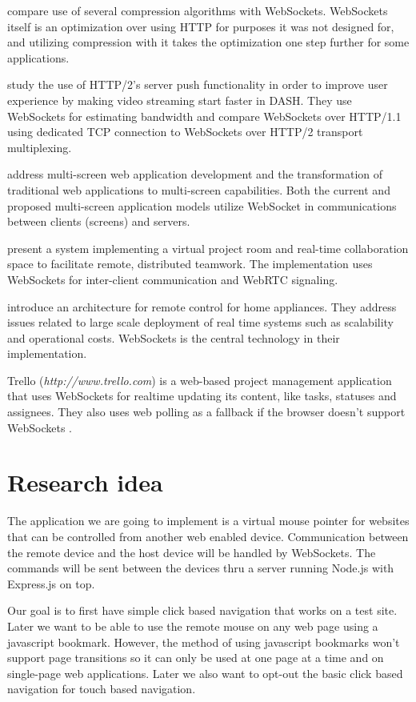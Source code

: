\documentclass[12pt,a4paper,english,oneside]{article}
\begin{document}
\citet{compression} compare use of several compression algorithms with
WebSockets. WebSockets itself is an optimization over using HTTP for
purposes it was not designed for, and utilizing compression with it
takes the optimization one step further for some applications.

\citet{http2} study the use of HTTP/2's server push functionality in
order to improve user experience by making video streaming start
faster in DASH. They use WebSockets for estimating bandwidth and
compare WebSockets over HTTP/1.1 using dedicated TCP connection to
WebSockets over HTTP/2 transport multiplexing.

\citet{bassbouss} address multi-screen web application development and
the transformation of traditional web applications to multi-screen
capabilities. Both the current and proposed multi-screen application
models utilize WebSocket in communications between clients (screens)
and servers.

\citet{projectrooms} present a system implementing a virtual project
room and real-time collaboration space to facilitate remote,
distributed teamwork. The implementation uses WebSockets for
inter-client communication and WebRTC signaling.

\citet{homeappliances} introduce an architecture for remote control for
home appliances. They address issues related to large scale deployment
of real time systems such as scalability and operational
costs. WebSockets is the central technology in their implementation.

Trello (\emph{http://www.trello.com}) is a web-based project management application that uses WebSockets for realtime updating its content, like tasks, statuses and assignees. They also uses web polling as a fallback if the browser doesn't support WebSockets \citep{trello}.

\section{Research idea}

The application we are going to implement is a virtual mouse pointer for websites that can be controlled from another web enabled device. Communication between the remote device and the host device will be handled by WebSockets. The commands will be sent between the devices thru a server running Node.js with Express.js on top.

Our goal is to first have simple click based navigation that works on a test site. Later we want to be able to use the remote mouse on any web page using a javascript bookmark. However, the method of using javascript bookmarks won't support page transitions so it can only be used at one page at a time and on single-page web applications. Later we also want to opt-out the basic click based navigation for touch based navigation.
\end{document}
